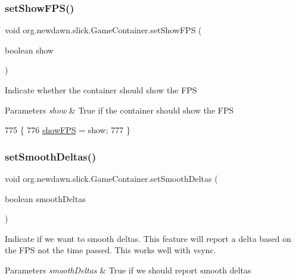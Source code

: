 \subsubsection{\texorpdfstring{set\+Show\+F\+P\+S()}{setShowFPS()}}
{\footnotesize\ttfamily void org.\+newdawn.\+slick.\+Game\+Container.\+set\+Show\+F\+PS (\begin{DoxyParamCaption}\item[{boolean}]{show }\end{DoxyParamCaption})\hspace{0.3cm}{\ttfamily [inline]}}

Indicate whether the container should show the F\+PS


\begin{DoxyParams}{Parameters}
{\em show} & True if the container should show the F\+PS \\
\hline
\end{DoxyParams}

\begin{DoxyCode}
775                                          \{
776         \mbox{\hyperlink{classorg_1_1newdawn_1_1slick_1_1_game_container_a21f562c31b09838dbfb2f21048f093c6}{showFPS}} = show;
777     \}
\end{DoxyCode}
\mbox{\label{classorg_1_1newdawn_1_1slick_1_1_game_container_a5e7a13f0c4752a6977f908572592bbea}} 
\subsubsection{\texorpdfstring{set\+Smooth\+Deltas()}{setSmoothDeltas()}}
{\footnotesize\ttfamily void org.\+newdawn.\+slick.\+Game\+Container.\+set\+Smooth\+Deltas (\begin{DoxyParamCaption}\item[{boolean}]{smooth\+Deltas }\end{DoxyParamCaption})\hspace{0.3cm}{\ttfamily [inline]}}

Indicate if we want to smooth deltas. This feature will report a delta based on the F\+PS not the time passed. This works well with vsync.


\begin{DoxyParams}{Parameters}
{\em smooth\+Deltas} & True if we should report smooth deltas \\
\hline
\end{DoxyParams}

